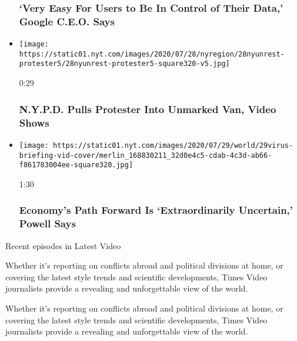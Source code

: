 \begin{itemize}
{  \subsubsection{`Very Easy For Users to Be In Control of Their Data,'
  Google C.E.O.
  Says}\label{very-easy-for-users-to-be-in-control-of-their-data-google-ceo-says}}
\item
  \href{https://www.nytimes.com/video/us/100000007262950/nypd-unmarked-van.html?action=click\&module=video-series-bar\&region=header\&pgtype=Article\&playlistId=video/latest-video}{}

  \texttt{[image: https://static01.nyt.com/images/2020/07/28/nyregion/28nyunrest-protester5/28nyunrest-protester5-square320-v5.jpg]}

  0:29

  \hypertarget{nypd-pulls-protester-into-unmarked-van-video-shows}{%
  \subsubsection{N.Y.P.D. Pulls Protester Into Unmarked Van, Video
  Shows}\label{nypd-pulls-protester-into-unmarked-van-video-shows}}
\item
  \href{https://www.nytimes.com/video/us/100000007262574/fed-powell-economy-coronavirus.html?action=click\&module=video-series-bar\&region=header\&pgtype=Article\&playlistId=video/latest-video}{}

  \texttt{[image: https://static01.nyt.com/images/2020/07/29/world/29virus-briefing-vid-cover/merlin\_168830211\_32d0e4c5-cdab-4c3d-ab66-f861783004ee-square320.jpg]}

  1:30

  \hypertarget{economys-path-forward-is-extraordinarily-uncertain-powell-says}{%
  \subsubsection{Economy's Path Forward Is `Extraordinarily Uncertain,'
  Powell
  Says}\label{economys-path-forward-is-extraordinarily-uncertain-powell-says}}
\end{itemize}

Recent episodes in Latest Video

Whether it's reporting on conflicts abroad and political divisions at
home, or covering the latest style trends and scientific developments,
Times Video journalists provide a revealing and unforgettable view of
the world.

Whether it's reporting on conflicts abroad and political divisions at
home, or covering the latest style trends and scientific developments,
Times Video journalists provide a revealing and unforgettable view of
the world.

